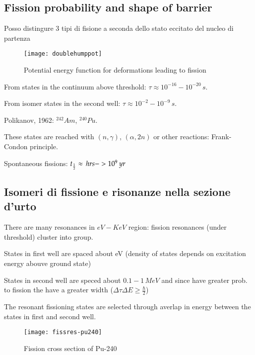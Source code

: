 \subsection{Fission probability and shape of barrier}
Posso distingure 3 tipi di fisione a seconda dello stato eccitato del nucleo di partenza
\begin{figure}[!ht]
\centering
\texttt{[image: doublehumppot]}
\caption{Potential energy function for deformations leading to fission}
\end{figure}

\begin{itemize*}
\item From states in the continuum above threshold: $\tau\approx10^{-16}-10^{-20}\,s$.
\item From isomer states in the second well: $\tau\approx10^{-2}-10^{-9}\,s$.

Polikanov, 1962: $^{242}Am$, $^{240}Pu$.

These states are reached with $(n,\gamma)$, $(\alpha,2n)$ or other reactions: Frank-Condon principle.
\item Spontaneous fissions: $t_{\frac{1}{2}}\approx\,hrs->10^9\,yr$
\end{itemize*}

\clearpage

\subsection{Isomeri di fissione e risonanze nella sezione d'urto}
There are many resonances in $eV-KeV$ region: fission resonances (under threshold) cluster into group.

\begin{itemize*}
\item States in first well are spaced about eV (density of states depends on excitation energy abouve ground state)
\item States in second well are speced about $0.1-1\,MeV$ and since have greater prob. to fission the have a greater width ($\Delta\tau\Delta E\geq\frac{\hbar}{2}$)
\end{itemize*}

The resonant fissioning states are selected through averlap in energy between the states in first and second well.

\begin{figure}[!ht]
\centering
\texttt{[image: fissres-pu240]}
\caption{Fission cross section of Pu-240}
\end{figure}

